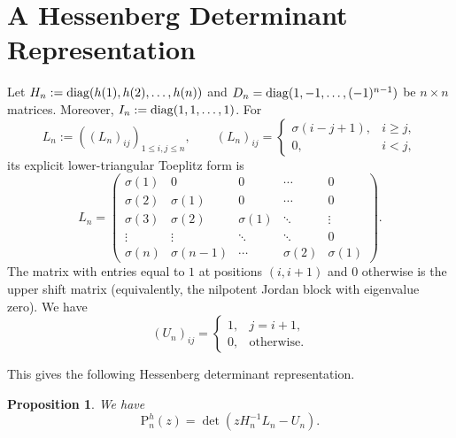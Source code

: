 \documentclass[11pt,reqno]{amsart}
\theoremstyle{plain}
\newtheorem{proposition}[theorem]{Proposition}
\theoremstyle{remark}
\theoremstyle{definition}
\numberwithin{equation}{section}
\def\func#1{\mathop{\rm #1}}%
\newcommand{\pol}{\mathrm{P}}
\begin{document}
\section{\label{a:hessenb}A Hessenberg Determinant Representation}
Let $H_n:= \func{diag}(h(1),h(2), \ldots,h(n))$ and $D_n= \func{diag}(1,-1, \ldots, (-1)^{n-1})$ be $n \times n$ matrices. Moreover, $I_n:= \func{diag}(1,1, \ldots,1)$.
For
\[
L_n:=\left( \left( L_{n}\right) %
_{ij}\right)_{1 \leq i,j \leq n},
\qquad
\left( L_{n}\right) _{ij}=
\begin{cases}
\sigma(i-j+1), & i\geq j,\\
0, & i<j,
\end{cases}
\]
its explicit lower-triangular Toeplitz form is
\[
L_n=
\begin{pmatrix}
\sigma(1) & 0 & 0 & \cdots & 0 \\
\sigma(2) & \sigma(1) & 0 & \cdots & 0 \\
\sigma(3) & \sigma(2) & \sigma(1) & \ddots & \vdots \\
\vdots & \vdots & \ddots & \ddots & 0 \\
\sigma(n) & \sigma(n-1) & \cdots & \sigma(2) & \sigma(1)
\end{pmatrix}.
\]
The matrix with entries equal to $1$ at positions $(i,i+1)$ and $0$ otherwise is the upper shift matrix (equivalently, the nilpotent Jordan block with eigenvalue zero). We have
\[
(U_n)_{ij}
=
\begin{cases}
1, & j=i+1,\\
0, & \text{otherwise}.
\end{cases}
\]

This gives the following Hessenberg determinant
representation.
\begin{proposition} We have
\begin{equation*} \label{Hessenberg}
\pol _n^{h}(z) =\det \left( z H_n^{-1} L_n - U_n \right).
\end{equation*}
\end{proposition}
\end{document}
